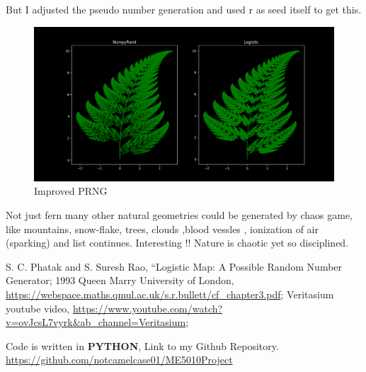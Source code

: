 \documentclass{report}
\begin{document}
But I adjusted the pseudo number generation and used r as seed itself to get this.

\begin{figure}[!h]
    \centering
    \includegraphics[scale=.3]{images/goodfern.png}
    \caption{Improved PRNG}
    \label{fig:my_label14}
\end{figure}
Not just fern many other natural geometries could be generated by chaos game, like mountains, snow-flake, trees, clouds ,blood vessles , ionization of air (sparking) and list continues. Interesting !!
Nature is chaotic yet so disciplined.
\newpage
\begin{thebibliography}{1}
	    S. C. Phatak and  S. Suresh Rao,
		``Logistic Map: A Possible Random Number
Generator;
		1993
		Queen Marry University of London,
		\url{https://webspace.maths.qmul.ac.uk/s.r.bullett/cf_chapter3.pdf};
		Veritasium youtube video,
		\url{https://www.youtube.com/watch?v=ovJcsL7vyrk&ab_channel=Veritasium};

	    Code is written in \textbf{PYTHON}, Link to my Github Repository.  \url{https://github.com/notcamelcase01/ME5010Project}
\end{thebibliography}
\end{document}
